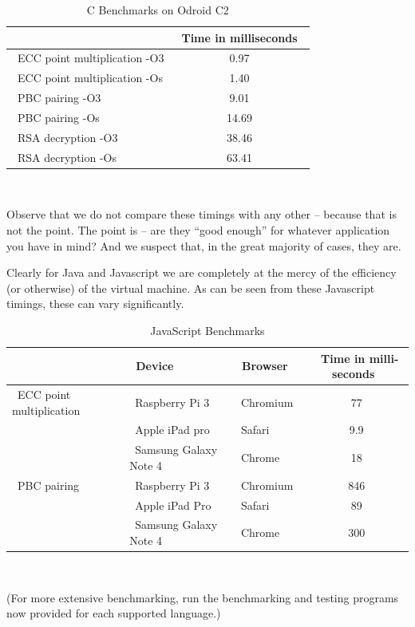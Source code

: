 \documentclass{llncs}
\begin{document}
\begin{table}
\centering
\begin{tabular}{|l|c|}
\hline
&~Time in milliseconds~\\
\hline
~ECC point multiplication -O3 & 0.97  \\ %
~ECC point multiplication -Os & 1.40 \\ %
~PBC pairing -O3 & 9.01 \\ %
~PBC pairing -Os & 14.69 \\ %
~RSA decryption -O3 & 38.46 \\  %
~RSA decryption -Os & 63.41 \\  %
\hline
\end{tabular}
~\\
\caption{C Benchmarks on Odroid C2}
\label{cspeed64}
\end{table}


Observe that we do not compare these timings with any other -- because that is not the point.
The point is -- are they ``good enough'' for whatever application you have in mind? And we suspect that, in the great majority of cases, they are.

Clearly for Java and Javascript we are completely at the mercy of the efficiency (or otherwise) of the virtual machine. As can be seen from these Javascript timings, these
can vary significantly.


\begin{table}
\centering
\begin{tabular}{|l|l|l|c|}
\hline
 & ~Device~ & ~Browser~ &~Time in milli-seconds~\\
\hline
~ECC point multiplication~  & ~Raspberry Pi 3~ & ~Chromium~ & 77  \\
  & ~Apple iPad pro~ & ~Safari~ & 9.9  \\
  & ~Samsung Galaxy Note 4~ & ~Chrome~ & 18  \\
~PBC pairing~  &  ~Raspberry Pi 3~ & ~Chromium~ & 846\\
 &  ~Apple iPad Pro~ & ~Safari~ & 89\\
 &  ~Samsung Galaxy Note 4~ & ~Chrome~ & 300\\
\hline
\end{tabular}
~\\
\caption{JavaScript Benchmarks}
\label{jsspeed}
\end{table}

(For more extensive benchmarking, run the benchmarking and testing programs now provided for each supported language.)
\end{document}
